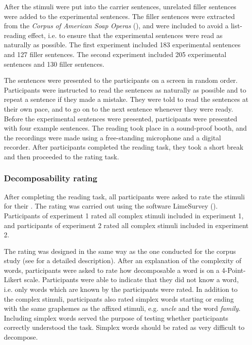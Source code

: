 
After the stimuli were put into the carrier sentences, unrelated filler sentences were added to the experimental sentences. The filler sentences were extracted from the \textit{Corpus of American Soap Operas} (\citealt{Davies.2011}), and were included  to avoid a list-reading effect, i.e. to ensure that the experimental sentences were read as naturally as possible. The first experiment included 183 experimental sentences and 127 filler sentences. The second experiment included 205 experimental sentences and 130 filler sentences. 

The sentences were presented to the participants on a screen in random order. 
Participants were instructed to read the sentences as naturally as possible and to repeat a sentence if they made a mistake. They were told to read the sentences at their own pace, and to go on to the next sentence whenever they were ready. Before the experimental sentences were presented, participants were presented with four example sentences. 
The reading took place in a sound-proof booth, and the recordings were made using a free-standing microphone and a digital recorder.
 After participants completed the reading task, they took a short break and then proceeded to the rating task.




\subsubsection{Decomposability rating}


After completing the reading task, all participants were asked to rate the stimuli for their . The rating was carried out using the software LimeSurvey (\citealt{LimeSurveyProjectTeam.2015}). Participants of experiment 1 rated all complex stimuli included in experiment 1, and participants of experiment 2 rated all complex stimuli included in experiment 2. 

The rating was designed in the same way as the one conducted for the corpus study (see  for a detailed description). After an explanation of the complexity of words, participants were asked to rate how decomposable a word is on a 4-Point-Likert scale. Participants were able to indicate that they did not know a word, i.e. only words which are known by the participants were rated. In addition to the complex stimuli, participants also rated simplex words starting or ending with the same graphemes as the affixed stimuli, e.g. \textit{{un}cle} and the word \textit{fami{ly}}. Including simplex words served the purpose of testing whether participants correctly understood the task. Simplex words should be rated as very difficult to decompose. 





